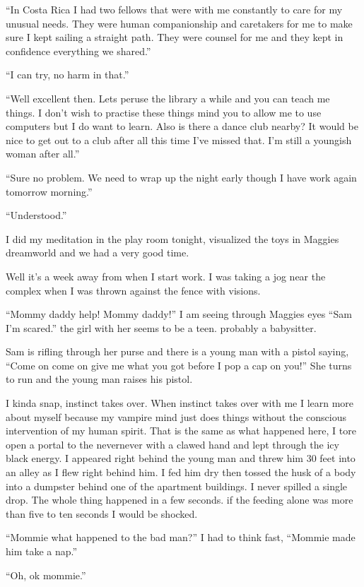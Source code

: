 ``In Costa Rica I had two fellows that were with me constantly to care for my unusual needs. They were human companionship and caretakers for me to make sure I kept sailing a straight path. They were counsel for me and they kept in confidence everything we shared.''

``I can try, no harm in that.''

``Well excellent then. Lets peruse the library a while and you can teach me things. I don't wish to practise these things mind you to allow me to use computers but I do want to learn. Also is there a dance club nearby? It would be nice to get out to a club after all this time I've missed that. I'm still a youngish woman after all.''

``Sure no problem. We need to wrap up the night early though I have work again tomorrow morning.''

``Understood.''

I did my meditation in the play room tonight, visualized the toys in Maggies dreamworld and we had a very good time.

Well it's a week away from when I start work. I was taking a jog near the complex when I was thrown against the fence with visions. 

``Mommy daddy help! Mommy daddy!'' I am seeing through Maggies eyes ``Sam I'm scared.'' the girl with her seems to be a teen. probably a babysitter. 

Sam is rifling through her purse and there is a young man with a pistol saying, ``Come on come on give me what you got before I pop a cap on you!'' She turns to run and the young man raises his pistol. 

I kinda snap, instinct takes over. When instinct takes over with me I learn more about myself because my vampire mind just does things without the conscious intervention of my human spirit. That is the same as what happened here, I tore open a portal to the nevernever with a clawed hand and lept through the icy black energy. I appeared right behind the young man and threw him 30 feet into an alley as I flew right behind him. I fed him dry then tossed the husk of a body into a dumpster behind one of the apartment buildings. I never spilled a single drop. The whole thing happened in a few seconds. if the feeding alone was more than five to ten seconds I would be shocked.

``Mommie what happened to the bad man?'' 
I had to think fast, ``Mommie made him take a nap.'' 

``Oh, ok mommie.'' 

